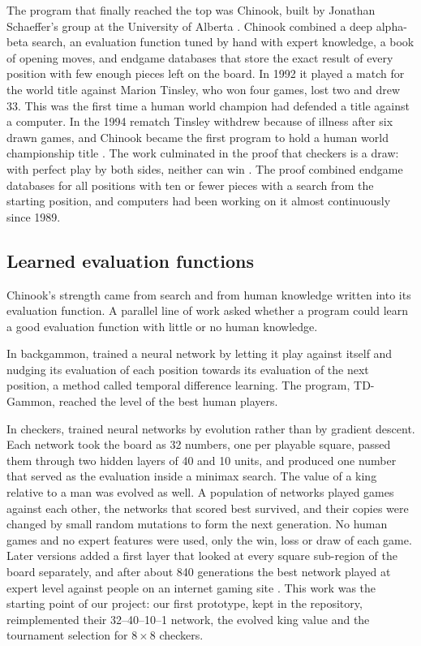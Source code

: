 The program that finally reached the top was Chinook, built by Jonathan
Schaeffer's group at the University of Alberta
\parencite{schaeffer1992,schaeffer1996}. Chinook combined a deep alpha-beta
search, an evaluation function tuned by hand with expert knowledge, a book of
opening moves, and endgame databases that store the exact result of every
position with few enough pieces left on the board. In 1992 it played a match for
the world title against Marion Tinsley, who won four games, lost two and drew 33.
This was the first time a human world champion had defended a title against a
computer. In the 1994 rematch Tinsley withdrew because of illness after six drawn
games, and Chinook became the first program to hold a human world championship
title \parencite{schaeffer1996}. The work culminated in the proof that checkers
is a draw: with perfect play by both sides, neither can win
\parencite{schaeffer2007}. The proof combined endgame databases for all positions
with ten or fewer pieces with a search from the starting position, and computers
had been working on it almost continuously since 1989.

\subsection{Learned evaluation functions}\label{sec:lit-learning}

Chinook's strength came from search and from human knowledge written into its
evaluation function. A parallel line of work asked whether a program could learn
a good evaluation function with little or no human knowledge.

In backgammon, \textcite{tesauro1995} trained a neural network by letting it play
against itself and nudging its evaluation of each position towards its evaluation
of the next position, a method called temporal difference learning. The program,
TD-Gammon, reached the level of the best human players.

In checkers, \textcite{chellapilla1999} trained neural networks by evolution
rather than by gradient descent. Each network took the board as 32 numbers, one
per playable square, passed them through two hidden layers of 40 and 10 units, and
produced one number that served as the evaluation inside a minimax search. The
value of a king relative to a man was evolved as well. A population of networks
played games against each other, the networks that scored best survived, and
their copies were changed by small random mutations to form the next generation.
No human games and no expert features were used, only the win, loss or draw of
each game. Later versions added a first layer that looked at every square
sub-region of the board separately, and after about 840 generations the best
network played at expert level against people on an internet gaming site
\parencite{chellapilla2001,fogel2002}. This work was the starting point of our
project: our first prototype, kept in the repository, reimplemented their
32--40--10--1 network, the evolved king value and the tournament selection for
$8\times8$ checkers.

